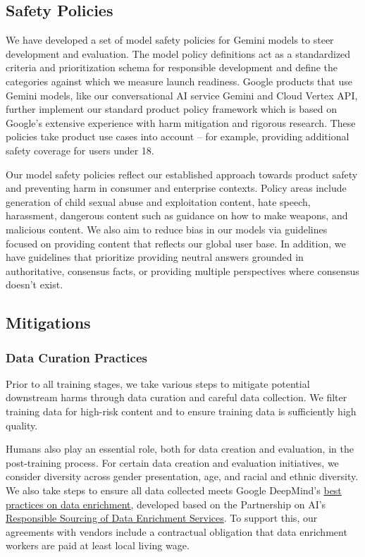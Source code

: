 \subsection{Safety Policies}

We have developed a set of model safety policies for Gemini models to steer development and evaluation. The model policy definitions act as a standardized criteria and prioritization schema for responsible development and define the categories against which we measure launch readiness. Google products that use Gemini models, like our conversational AI service Gemini and Cloud Vertex API, further implement our standard product policy framework which is based on Google’s extensive experience with harm mitigation and rigorous research.  These policies take product use cases into account – for example, providing additional safety coverage for users under 18.

Our model safety policies reflect our established approach towards product safety and preventing harm in consumer and enterprise contexts. Policy areas include generation of child sexual abuse and exploitation content, hate speech, harassment, dangerous content such as guidance on how to make weapons, and malicious content. We also aim to reduce bias in our models via  guidelines focused on providing content that reflects our global user base.  In addition, we have guidelines that prioritize providing neutral answers grounded in authoritative, consensus facts, or providing multiple perspectives where consensus doesn’t exist.  

\subsection{Mitigations}
\subsubsection{Data Curation Practices}
\label{sec:data_curation}

Prior to all training stages, we take various steps to mitigate potential downstream harms through data curation and careful data collection. We filter training data for high-risk content and to ensure training data is sufficiently high quality.

Humans also play an essential role, both for data creation and evaluation, in the post-training process. For certain data creation and evaluation initiatives, we consider diversity across gender presentation, age, and racial and ethnic diversity. We also take steps to ensure all data collected meets Google DeepMind’s \href{https://deepmind.google/discover/blog/best-practices-for-data-enrichment/}{best practices on data enrichment}, developed based on the Partnership on AI’s \href{https://partnershiponai.org/responsible-sourcing-considerations/}{Responsible Sourcing of Data Enrichment Services}. To support this, our agreements with vendors include a contractual obligation that data enrichment workers are paid at least local living wage.

